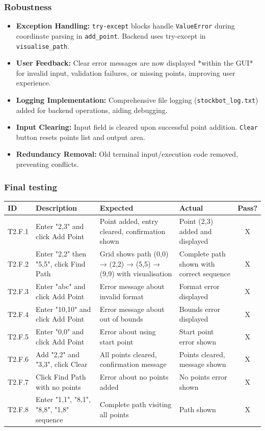 \subsubsection{Robustness}
\begin{itemize}
	\item \textbf{Exception Handling:} \verb|try-except| blocks handle \verb|ValueError| during coordinate parsing in \verb|add_point|. Backend uses try-except in \verb|visualise_path|.
	\item \textbf{User Feedback:} Clear error messages are now displayed *within the GUI* for invalid input, validation failures, or missing points, improving user experience.
	\item \textbf{Logging Implementation:} Comprehensive file logging (\verb|stockbot_log.txt|) added for backend operations, aiding debugging.
	\item \textbf{Input Clearing:} Input field is cleared upon successful point addition. \verb|Clear| button resets points list and output area.
	\item \textbf{Redundancy Removal:} Old terminal input/execution code removed, preventing conflicts.
\end{itemize}

\newpage

\subsubsection{Final testing}

\begin{table}[!htbp]
	\centering
	\begin{tabularx}{\textwidth}{|l|X|p{3.5cm}|p{3.5cm}|c|}
		\hline
		\textbf{ID} & \textbf{Description} & \textbf{Expected} & \textbf{Actual} & \textbf{Pass?} \\
		\hline
		T2.F.1 & Enter "2,3" and click Add Point & Point added, entry cleared, confirmation shown & Point (2,3) added and displayed & X \\
		\hline
		T2.F.2 & Enter "2,2" then "5,5", click Find Path & Grid shows path (0,0) → (2,2) → (5,5) → (9,9) with visualisation & Complete path shown with correct sequence & X \\
		\hline
		T2.F.3 & Enter "abc" and click Add Point & Error message about invalid format & Format error displayed & X \\
		\hline
		T2.F.4 & Enter "10,10" and click Add Point & Error message about out of bounds & Bounds error displayed & X \\
		\hline
		T2.F.5 & Enter "0,0" and click Add Point & Error about using start point & Start point error shown & X \\
		\hline
		T2.F.6 & Add "2,2" and "3,3", click Clear & All points cleared, confirmation message & Points cleared, message shown & X \\
		\hline
		T2.F.7 & Click Find Path with no points & Error about no points added & No points error shown & X \\
		\hline
		T2.F.8 & Enter "1,1", "8,1", "8,8", "1,8" sequence & Complete path visiting all points & Path shown & X \\
		\hline
	\end{tabularx}
\end{table}


